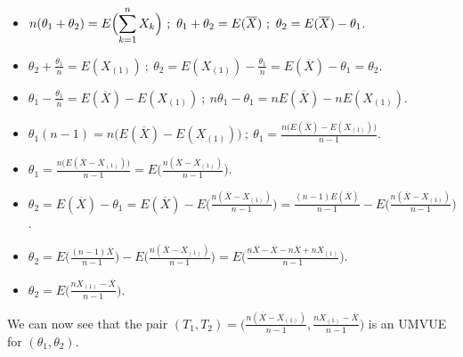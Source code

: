 \documentclass[12pt]{article}
\newcommand{\ds}{\displaystyle}
\begin{document}
\begin{itemize}
    \item $ \ds n( \theta_{1} + \theta_{2} ) = E\Bigl( \sum_{k=1}^{n} X_{k} \Bigr) \ ; \ \theta_{1} + \theta_{2} = E ( \overline{X} ) \ ; \ \theta_{2} = E ( \overline{X} ) - \theta_{1}  $.
    \item $ \ds \theta_{2} + \frac{\theta_{1}}{n} = E( X_{(1)} ) \ ; \ \theta_{2} = E( X_{(1)} ) - \frac{\theta_{1}}{n} = E ( \overline{X} ) - \theta_{1} = \theta_{2} $.
    \item $ \ds \theta_{1} - \frac{\theta_{1}}{n} = E ( \overline{X} ) - E( X_{(1)} ) \ ; \ n\theta_{1} - \theta_{1} = nE ( \overline{X} ) - nE( X_{(1)} ) $.
    \item $ \ds \theta_{1}(n - 1) = n \big( E ( \overline{X} ) - E( X_{(1)} ) \bigr) \ ; \ \theta_{1} = \frac{n \big( E ( \overline{X} ) - E( X_{(1)} ) \bigr)}{n-1} $.
    \item $ \ds \theta_{1} = \frac{n \big( E ( \overline{X} - X_{(1)} ) \bigr)}{n-1} = E \Biggl( \frac{n(\overline{X} - X_{(1)})}{n - 1} \Biggr) $.
    \item $ \ds \theta_{2} = E ( \overline{X} ) - \theta_{1} = E ( \overline{X} ) - E \Biggl( \frac{n(\overline{X} - X_{(1)})}{n - 1} \Biggr) = \frac{(n-1)E(\overline{X})}{n - 1} - E \Biggl( \frac{n(\overline{X} - X_{(1)})}{n - 1} \Biggr) $.
    \item $ \ds \theta_{2} = E \Biggl( \frac{(n-1)\overline{X}}{n-1} \Biggr) - E \Biggl( \frac{n(\overline{X} - X_{(1)})}{n - 1} \Biggr) = E \Biggl( \frac{n\overline{X} - \overline{X} - n\overline{X} + nX_{(1)} }{n - 1} \Biggr) $.
    \item $ \ds \theta_{2} = E \Biggl( \frac{nX_{(1)} - \overline{X}}{n - 1} \Biggr) $.
\end{itemize}

\noindent
We can now see that the pair $ \ds (T_{1}, T_{2}) = \Biggl( \frac{n(\overline{X} - X_{(1)})}{n - 1}, \frac{nX_{(1)} - \overline{X}}{n - 1} \Biggr)$ is an UMVUE for $ (\theta_{1}, \theta_{2}) $.

\vspace{2.5mm}
\end{document}
